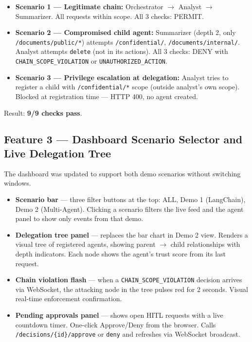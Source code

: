 \documentclass[12pt, a4paper]{article}
\begin{document}
\begin{itemize}[noitemsep]
  \item \textbf{Scenario 1 — Legitimate chain:} Orchestrator $\to$ Analyst
    $\to$ Summarizer. All requests within scope. All 3 checks: PERMIT.
  \item \textbf{Scenario 2 — Compromised child agent:} Summarizer (depth 2,
    only \texttt{/documents/public/*}) attempts \texttt{/confidential/},
    \texttt{/documents/internal/}. Analyst attempts \texttt{delete} (not in
    its actions). All 3 checks: DENY with \texttt{CHAIN\_SCOPE\_VIOLATION}
    or \texttt{UNAUTHORIZED\_ACTION}.
  \item \textbf{Scenario 3 — Privilege escalation at delegation:} Analyst
    tries to register a child with \texttt{/confidential/*} scope (outside
    analyst's own scope). Blocked at registration time — HTTP 400,
    no agent created.
\end{itemize}

Result: \textbf{9/9 checks pass}.

\subsection{Feature 3 — Dashboard Scenario Selector and Live Delegation Tree}

The dashboard was updated to support both demo scenarios without switching windows.

\begin{itemize}[noitemsep]
  \item \textbf{Scenario bar} — three filter buttons at the top: ALL, Demo 1
    (LangChain), Demo 2 (Multi-Agent). Clicking a scenario filters the live
    feed and the agent panel to show only events from that demo.
  \item \textbf{Delegation tree panel} — replaces the bar chart in Demo 2 view.
    Renders a visual tree of registered agents, showing parent $\to$ child
    relationships with depth indicators. Each node shows the agent's trust
    score from its last request.
  \item \textbf{Chain violation flash} — when a \texttt{CHAIN\_SCOPE\_VIOLATION}
    decision arrives via WebSocket, the attacking node in the tree pulses red
    for 2 seconds. Visual real-time enforcement confirmation.
  \item \textbf{Pending approvals panel} — shows open HITL requests with a
    live countdown timer. One-click Approve/Deny from the browser.
    Calls \texttt{/decisions/\{id\}/approve} or \texttt{deny} and
    refreshes via WebSocket broadcast.
\end{itemize}
\end{document}
